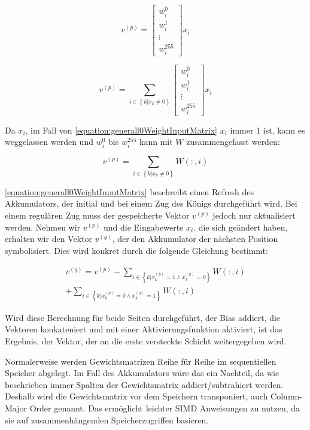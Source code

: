 \begin{equation}
  v^{(p)}=\begin{bmatrix}
    w_{i}^{0} \\
    w_{i}^{1} \\
    \vdots    \\
    w_{i}^{255}
  \end{bmatrix} x_{i}
  \label{equation:ithl0WeightInputMatrix}
\end{equation}

\begin{equation}
  v^{(p)}= \sum_{i\in\left \{  k|x_{k}\neq 0\right \}} \begin{bmatrix}
    w_{i}^{0} \\
    w_{i}^{1} \\
    \vdots    \\
    w_{i}^{255}
  \end{bmatrix} x_{i}
  \label{equation:generall0WeightInputMatrix}
\end{equation}

Da $x_{i}$, im Fall von \autoref{equation:generall0WeightInputMatrix} $x_{i}$ immer 1 ist, kann es weggelassen werden und $w_{i}^{0}$ bis $w_{i}^{255}$ kann mit $W$ zusammengefasst werden:

\begin{equation}
  v^{(p)}= \sum_{i\in\left \{  k|x_{k}\neq 0\right \}} W(:,i)
  \label{equation:generall0WeightInputMatrixNoX}
\end{equation}

\autoref{equation:generall0WeightInputMatrix} beschreibt einen Refresh des Akkumulators, der initial und bei einem Zug des Königs durchgeführt wird. Bei einem regulären Zug muss der gespeicherte Vektor $v^{(p)}$ jedoch nur aktualisiert werden. Nehmen wir $v^{(p)}$ und die Eingabewerte $x_{i}$. die sich geändert haben, erhalten wir den Vektor $v^{(q)}$, der den Akkumulator der nächsten Position symbolisiert. Dies wird konkret durch die folgende Gleichung bestimmt:

\begin{equation}
  \begin{split}
    v^{(q)} = v^{(p)}
    - \sum_{i \in \left \{ k | x_{k}^{(p)}=1\wedge x_{k}^{(q)}=0 \right \}}^{} W(:,i) \\
    + \sum_{i \in \left \{ k | x_{k}^{(p)}=0\wedge x_{k}^{(q)}=1 \right \}}^{} W(:,i)
  \end{split}
  \label{equation:akkumulatoreAktualisierung}
\end{equation}

Wird diese Berechnung für beide Seiten durchgeführt, der Bias addiert, die Vektoren konkateniert und mit einer Aktivierungsfunktion aktiviert, ist das Ergebnis, der Vektor, der an die erste versteckte Schicht weitergegeben wird.

Normalerweise werden Gewichtsmatrizen Reihe für Reihe im sequentiellen Speicher abgelegt. Im Fall des Akkumulators wäre das ein Nachteil, da wie beschrieben immer Spalten der Gewichtsmatrix addiert/subtrahiert werden. Deshalb wird die Gewichtsmatrix vor dem Speichern transponiert, auch Column-Major Order genannt. Das ermöglicht leichter \ac{SIMD} Anweisungen zu nutzen, da sie auf zusammenhängenden Speicherzugriffen basieren.